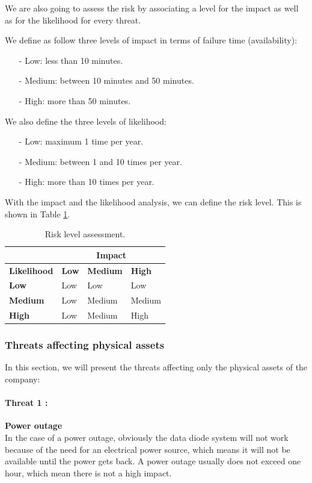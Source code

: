 \documentclass[a4paper,10pt]{article}
\begin{document}
We are also going to assess the risk by associating a level for the impact as well as for the likelihood for every threat. 

We define as follow three levels of impact in terms of failure time (availability):
\begin{enumerate}
	\item[-] Low: less than 10 minutes.
	\item[-] Medium: between 10 minutes and 50 minutes.
	\item[-] High: more than 50 minutes.
\end{enumerate}

We also define the three levels of likelihood:
\begin{enumerate}
	\item[-] Low: maximum 1 time per year.
	\item[-] Medium: between 1 and 10 times per year.
	\item[-] High: more than 10 times per year.
\end{enumerate}

With the impact and the likelihood analysis, we can define the risk level. This is shown in Table \ref{tab:risk}.

\begin{table}[!h]
	\centering
	\begin{tabular}{|l|l|l|l|}
		\hline
		 & \multicolumn{3}{|c|}{\textbf{Impact}}  \\ \hline
		\textbf{Likelihood} & \textbf{Low} & \textbf{Medium} & \textbf{High} \\ \hline
		\textbf{Low}& Low & Low & Low \\ \hline
		\textbf{Medium} & Low & Medium & Medium \\ \hline
		\textbf{High} & Low & Medium &  High \\ \hline
	\end{tabular}
	\caption{Risk level assessment.}
	\label{tab:risk}
\end{table}

\subsubsection{Threats affecting physical assets}
In this section, we will present the threats affecting only the physical assets of the company:


\paragraph{Threat 1 :}  \textbf{Power outage}\\
\indent In the case of a power outage, obviously the data diode system will not work because of the need for an electrical power source, which means it will not be available until the power gets back. A power outage usually does not exceed one hour, which mean there is not a high impact.
\end{document}
